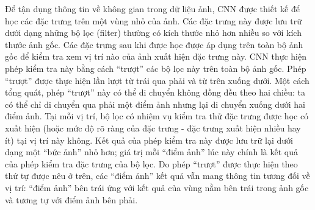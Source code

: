 	Để tận dụng thông tin về không gian trong dữ liệu ảnh, CNN được thiết kế để học các đặc trưng trên một vùng nhỏ của ảnh.
	Các đặc trưng này được lưu trữ dưới dạng những bộ lọc (filter) thường có kích thước nhỏ hơn nhiều so với kích thước ảnh gốc.
	Các đặc trưng sau khi được học được áp dụng trên toàn bộ ảnh gốc để kiểm tra xem vị trí nào của ảnh xuất hiện đặc trưng này.
	CNN thực hiện phép kiểm tra này bằng cách ``trượt'' các bộ lọc này trên toàn bộ ảnh gốc.
	Phép ``trượt'' được thực hiện lần lượt từ trái qua phải và từ trên xuống dưới.
	Một cách tổng quát, phép ``trượt'' này có thể di chuyển không đồng đều theo hai chiều: ta có thể chỉ di chuyển qua phải một điểm ảnh nhưng lại di chuyển xuống dưới hai điểm ảnh.
	Tại mỗi vị trí, bộ lọc có nhiệm vụ kiểm tra thử đặc trưng được học có xuất hiện (hoặc mức độ rõ ràng của đặc trưng - đặc trưng xuất hiện nhiều hay ít) tại vị trí này không.
	Kết quả của phép kiểm tra này được lưu trữ lại dưới dạng một ``bức ảnh'' nhỏ hơn; giá trị mỗi ``điểm ảnh'' lúc này chính là kết quả của phép kiểm tra đặc trưng của bộ lọc.
	Do phép ``trượt'' được thực hiện theo thứ tự được nêu ở trên, các ``điểm ảnh'' kết quả vẫn mang thông tin tương đối về vị trí: ``điểm ảnh'' bên trái ứng với kết quả của vùng nằm bên trái trong ảnh gốc và tương tự với điểm ảnh bên phải.
